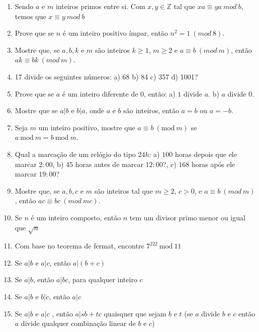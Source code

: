 \documentclass[]{book}
\theoremstyle{definition}
\begin{document}
\begin{enumerate}
\item\label{caushw} Sendo $a$ e $m$ inteiros primos entre si. Com $x,y \in \mathbb{Z}$ tal que $xa \equiv ya\ mod\ b$, temos que $x \equiv y\ mod\ b$

\item\label{caushw} Prove que se $n$ é um inteiro positivo ímpar, então $n^2 = 1\ (mod\ 8)$.

\item\label{caushw} Mostre que, se $a, b, k$ e $m$ são inteiros $k \geq 1$, $m \geq 2$ e $a \equiv b\ (mod\ m)$, então  $ak \equiv bk\ (mod\ m)$.

\item\label{caushw} 17 divide os seguintes números: a) 68 b) 84 c) 357 d) 1001?

\item\label{caushw} Prove que se $a$ é um inteiro diferente de $0$, então: a) $1$ divide $a$. b) $a$ divide $0$.

\item\label{caushw} Mostre que se $a | b$ e  $b | a$,  onde $a$ e  $b$ são inteiros, então $a = b$ ou  $a = -b$.

\item\label{caushw} Seja $m$ um inteiro positivo, mostre que $a \equiv b\ (\textrm{mod}\ m)$ se $a\ \textrm{mod}\ m = b\ \textrm{mod}\ m$.

\item\label{caushw} Qual a marcação de um relógio do tipo $24h$: a) $100$ horas depois que ele marcar $2:00$, b) $45$ horas antes de marcar $12:00$?, c) $168$ horas após ele marcar $19:00$?

\item\label{caushw} Mostre que, se $a, b, c$ e  $m$ são inteiros tal que $m \geq 2$, $c > 0$, e $a \equiv b\ (mod\ m)$, então  $ac \equiv bc\ (mod\ mc)$.

\item\label{caushw} Se $n$ é um inteiro composto, então $n$ tem um divisor primo menor ou igual que $\sqrt{n}$

\item\label{caushw} Com base no teorema de fermat, encontre $7^{222}\  \textrm{mod}\ 11$

\item\label{caushw} Se $a | b$ e $a | c$, então $a | (b + c)$
\item\label{caushw} Se $a | b$, então $a | bc$, para qualquer inteiro $c$
\item\label{caushw} Se $a | b$ e $b | c$, então $a | c$
\item\label{caushw} Se $a | b$ e $a | c$ , então $a | sb + tc$ quaisquer que sejam $b$ e $t$ (se $a$ divide $b$ e $c$ então $a$ divide qualquer combinação linear de $b$ e $c$)


\end{enumerate}
\end{document}
